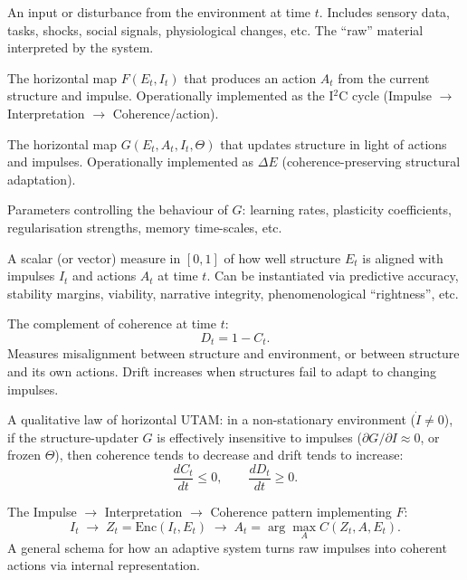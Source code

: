 \documentclass[12pt,a4paper]{report}
\begin{document}
\begin{description}[leftmargin=2.5cm,style=nextline]
    \item[\textbf{Impulse} (\(I_t\))] 
    An input or disturbance from the environment at time \(t\). Includes sensory data, tasks, shocks, social signals, physiological changes, etc. The ``raw'' material interpreted by the system.

    \item[\(\mathbf{F}\) (Action-generator)] 
    The horizontal map \(F(E_t, I_t)\) that produces an action \(A_t\) from the current structure and impulse. Operationally implemented as the I$^2$C cycle (Impulse $\to$ Interpretation $\to$ Coherence/action).

    \item[\(\mathbf{G}\) (Structure-updater)] 
    The horizontal map \(G(E_t, A_t, I_t, \Theta)\) that updates structure in light of actions and impulses. Operationally implemented as $\Delta E$ (coherence-preserving structural adaptation).

    \item[\(\Theta\) (Adaptation parameters)] 
    Parameters controlling the behaviour of \(G\): learning rates, plasticity coefficients, regularisation strengths, memory time-scales, etc.

    \item[\textbf{Coherence} (\(C_t\))] 
    A scalar (or vector) measure in \([0,1]\) of how well structure \(E_t\) is aligned with impulses \(I_t\) and actions \(A_t\) at time \(t\). Can be instantiated via predictive accuracy, stability margins, viability, narrative integrity, phenomenological ``rightness'', etc.

    \item[\textbf{Drift} (\(D_t\))] 
    The complement of coherence at time \(t\):
    \[
        D_t = 1 - C_t.
    \]
    Measures misalignment between structure and environment, or between structure and its own actions. Drift increases when structures fail to adapt to changing impulses.

    \item[\textbf{Drift Law}] 
    A qualitative law of horizontal UTAM: in a non-stationary environment (\(\dot{I} \neq 0\)), if the structure-updater \(G\) is effectively insensitive to impulses (\(\partial G / \partial I \approx 0\), or frozen \(\Theta\)), then coherence tends to decrease and drift tends to increase:
    \[
        \frac{d C_t}{dt} \le 0, \qquad \frac{d D_t}{dt} \ge 0.
    \]

    \item[\textbf{I$^2$C cycle}] 
    The Impulse $\to$ Interpretation $\to$ Coherence pattern implementing \(F\):
    \[
        I_t \;\to\; Z_t = \mathrm{Enc}(I_t, E_t)
        \;\to\; A_t = \arg\max_{A} C(Z_t, A, E_t).
    \]
    A general schema for how an adaptive system turns raw impulses into coherent actions via internal representation.


\end{description}
\end{document}
